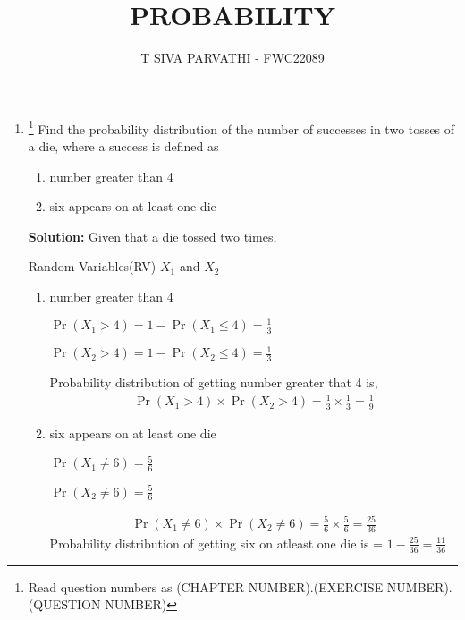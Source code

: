 \documentclass{article}
\providecommand{\pr}[1]{\ensuremath{\Pr\left(#1\right)}}
\newcommand{\solution}{\noindent \textbf{Solution: }}
\begin{document}
\title{PROBABILITY}
\author{\Large T SIVA PARVATHI - FWC22089}
\date{}

\maketitle
\begin{enumerate}[label=13.\arabic{enumi}.\arabic{enumii}]%
\setcounter{enumi}{3}
\setcounter{enumii}{5}

\item \footnote{Read question numbers as (CHAPTER NUMBER).(EXERCISE NUMBER).(QUESTION NUMBER)}
Find the probability distribution of the number of successes in two tosses of a die, where a success is defined as
\begin{enumerate}
\item number greater than 4
\item six appears on at least one die
\end{enumerate}

\solution
Given that a die tossed two times,
\begin{table}[h]\centering
	
	 \caption{Random Variables(RV) $X_1$ and $X_2$}\label{table:1}
\end{table}

\begin{enumerate}
\item number greater than 4

$\pr{X_1>4}=1-\pr{X_1\le4}=\frac{1}{3}$

$\pr{X_2>4}=1-\pr{X_2\le4}=\frac{1}{3}$

Probability distribution of getting number greater that 4 is,
\begin{align}
\pr{X_1>4} \times \pr{X_2>4} = \frac{1}{3} \times \frac{1}{3}=\frac{1}{9}
\end{align}
\item six appears on at least one die

$\pr{X_1\neq6}=\frac{5}{6}$

$\pr{X_2\neq6}=\frac{5}{6}$

\begin{align}
\pr{X_1\neq6} \times \pr{X_2\neq6} = \frac{5}{6} \times \frac{5}{6}=\frac{25}{36}
\end{align}
Probability distribution of getting six on atleast one die is = $
1-\frac{25}{36} = \frac{11}{36}$
\end{enumerate}
\end{enumerate}
\end{document}
